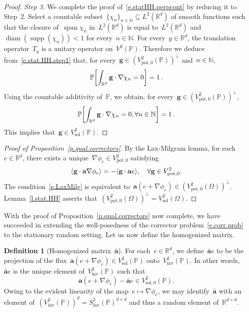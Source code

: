 \documentclass[11pt,twoside]{article} %
\numberwithin{equation}{section}
\theoremstyle{definition}
\newtheorem{definition}[theorem]{Definition}
\let\originalleft\left
\let\originalright\right
\renewcommand{\left}{\mathopen{}\mathclose\bgroup\originalleft}
\renewcommand{\right}{\aftergroup\egroup\originalright}
\newcommand*{\N}{\ensuremath{\mathbb{N}}}
\newcommand*{\R}{\ensuremath{\mathbb{R}}}
\newcommand*{\Rd}{\ensuremath{\mathbb{R}^d}}
\newcommand{\g}{\mathbf{g}}
\newcommand{\pot}{\mathrm{pot}}
\newcommand{\sol}{\mathrm{sol}}
\newcommand{\inv}{\mathrm{inv}}
\renewcommand{\a}{\mathbf{a}}
\newcommand{\ahom}{\bar{\a}}
\renewcommand{\P}{\mathbb{P}}
\DeclareMathOperator{\diam}{diam}
\DeclareMathOperator{\supp}{supp}
\DeclareMathOperator{\spn}{span}
\begin{document}
\begin{proof}
\smallskip

\emph{Step 3.} We complete the proof of~\eqref{e.statHH.perpcont} by reducing it to Step~2. Select a countable subset~$\{ \chi_n\}_{n\in\N} \subseteq L^2(\Rd)$ of smooth functions such that the closure of~$\spn \chi_n$ in~$L^2(\Rd)$ is equal to~$L^2(\Rd)$ and~$\diam(\supp(\chi_n )) < 1$ for every~$n\in\N$. For every~$y\in\Rd$, the translation operator~$T_y$ is a unitary operator on~$V^2(\P)$. Therefore we deduce from~\eqref{e.stat.HH.step1} that, for every~$\g\in (V^2_{\pot,0}(\P))^\perp$ and~$n\in\N$, 
\begin{equation}
\P \left[ \int_{\Rd} \g \cdot \nabla \chi_n =0 \right] = 1 \,. 
\end{equation}
Using the countable additivity of~$\P$, we obtain, for every~$\g\in (V^2_{\pot,0}(\P))^\perp$,
\begin{equation}
\P \left[  \int_{\Rd} \g \cdot \nabla \chi_n =0, \forall n\in\N \right] = 1 \,. 
\end{equation}
This implies that~$\g \in V^2_\sol(\P)$. 
\end{proof}



\begin{proof}[{Proof of Proposition~\ref{p.qual.correctors}}]
By the Lax-Milgram lemma, for each~$e\in\Rd$, there exists a unique~$\nabla \phi_e \in V^2_{\pot,0}$ satisfying 
\begin{equation}
\label{e.LaxMilg}
\left\langle \g \cdot \a \nabla \phi_e \right\rangle 
= 
-\langle \g \cdot \a e \rangle, \quad \forall \g \in V^2_{\pot,0}.
\end{equation}
The condition~\eqref{e.LaxMilg} is equivalent to~$\a(e+\nabla \phi_e) \in (V^2_{\pot,0}(\Omega))^\perp$.
Lemma~\ref{l.stat.HH} asserts that~$(V^2_{\pot,0}(\Omega))^\perp = V^2_\sol(\Omega)$.
\end{proof}

With the proof of Proposition~\ref{p.qual.correctors} now complete, we have succeeded in extending the well-posedness of the corrector problem~\eqref{e.corr.prob} to the stationary random setting. Let us now define the homogenized matrix.

\begin{definition}[{Homogenized matrix~$\ahom$}]
For each~$e\in\Rd$, we define~$\ahom e$ to be the projection of the flux~$\a(e+\nabla\phi_e) \in V^2_\sol(\P)$ onto~$V^2_{\inv}(\P)$. In other words,~$\ahom e$ is the unique element of~$V^2_{\inv}(\P)$ such that
\begin{equation}
\label{e.ahom.def.sec2}
\a(e+\nabla\phi_e) - \ahom e \in V^2_{\sol,0}(\P).
\end{equation}
Owing to the evident linearity of the map~$e\mapsto \nabla \phi_e$, we may identify~$\ahom$ with an element of~$(V^2_{\inv}(\P))^{d} = S^2_{\inv}(\P)^{d\times d}$ and thus a random element of~$\R^{d\times d}$.
\end{definition}
\end{document}
